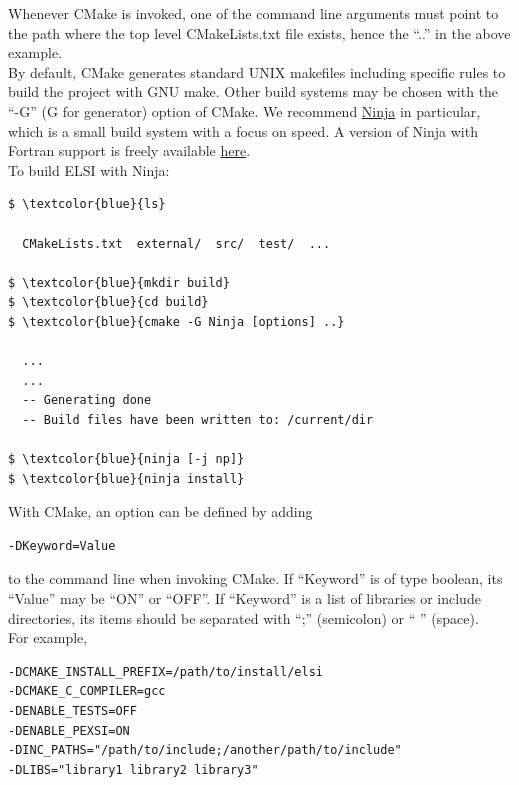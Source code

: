 \documentclass{report}
\begin{document}
Whenever CMake is invoked, one of the command line arguments must point to the path where the top level CMakeLists.txt file exists, hence the ``..'' in the above example.\\

By default, CMake generates standard UNIX makefiles including specific rules to build the project with GNU make.  Other build systems may be chosen with the ``-G'' (G for generator) option of CMake.  We recommend \href{http://ninja-build.org}{Ninja} in particular, which is a small build system with a focus on speed.  A version of Ninja with Fortran support is freely available \href{http://github.com/Kitware/ninja}{here}.\\

To build ELSI with Ninja:\\

\begin{Verbatim}[commandchars=\\\{\}]
$ \textcolor{blue}{ls}

  CMakeLists.txt  external/  src/  test/  ...

$ \textcolor{blue}{mkdir build}
$ \textcolor{blue}{cd build}
$ \textcolor{blue}{cmake -G Ninja [options] ..}

  ...
  ...
  -- Generating done
  -- Build files have been written to: /current/dir

$ \textcolor{blue}{ninja [-j np]}
$ \textcolor{blue}{ninja install}
\end{Verbatim}

With CMake, an option can be defined by adding\\

\begin{verbatim}
-DKeyword=Value
\end{verbatim}

to the command line when invoking CMake.  If ``Keyword'' is of type boolean, its ``Value'' may be ``ON'' or ``OFF''.  If ``Keyword'' is a list of libraries or include directories, its items should be separated with ``;'' (semicolon) or `` '' (space).\\

For example,\\

\begin{verbatim}
-DCMAKE_INSTALL_PREFIX=/path/to/install/elsi
-DCMAKE_C_COMPILER=gcc
-DENABLE_TESTS=OFF
-DENABLE_PEXSI=ON
-DINC_PATHS="/path/to/include;/another/path/to/include"
-DLIBS="library1 library2 library3"
\end{verbatim}
\end{document}
